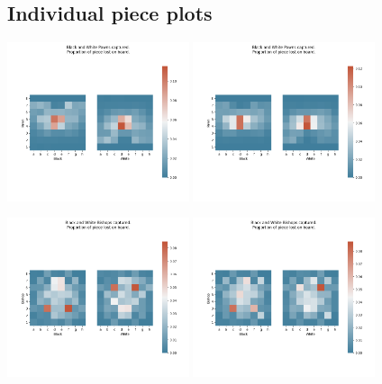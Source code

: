 \documentclass[11pt]{article}
\begin{document}
\subsection{Individual piece plots}
\label{sec:orgcad697e}
\begin{center}
\includegraphics[width=0.4\textwidth]{Images/_HEATMAP_Pawn_FISC.png}
\includegraphics[width=0.4\textwidth]{Images/_HEATMAP_Pawn_TOURNEMENTS.png}
\end{center}
\begin{center}
\includegraphics[width=0.4\textwidth]{Images/_HEATMAP_Bishop_FISC.png}
\includegraphics[width=0.4\textwidth]{Images/_HEATMAP_Bishop_TOURNEMENTS.png}
\end{center}
\end{document}
